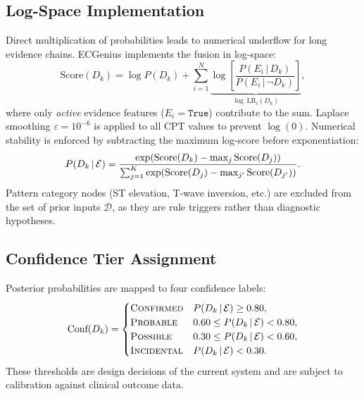 \documentclass[journal]{IEEEtran}
\begin{document}
\subsection{Log-Space Implementation}

Direct multiplication of probabilities leads to numerical underflow
for long evidence chains.
ECGenius implements the fusion in log-space:
\begin{equation}
  \text{Score}(D_k) = \log P(D_k) + \sum_{i=1}^{N}
  \underbrace{\log\!\left[\frac{P(E_i \,|\, D_k)}{P(E_i \,|\, \neg D_k)}\right]}_{\log\,\text{LR}_i(D_k)},
  \label{eq:log_score}
\end{equation}
where only \emph{active} evidence features ($E_i = \texttt{True}$)
contribute to the sum.
Laplace smoothing $\varepsilon = 10^{-6}$ is applied to all CPT
values to prevent $\log(0)$.
Numerical stability is enforced by subtracting the maximum log-score
before exponentiation:
\begin{equation}
  P(D_k \,|\, \mathcal{E}) = \frac{%
  \exp\!\left(\text{Score}(D_k) - \max_{j} \text{Score}(D_j)\right)}{%
  \sum_{j=1}^{K}
  \exp\!\left(\text{Score}(D_j) - \max_{j'} \text{Score}(D_{j'})\right)}.
  \label{eq:softmax_stable}
\end{equation}
Pattern category nodes (ST elevation, T-wave inversion, etc.) are
excluded from the set of prior inputs $\mathcal{D}$, as they are
rule triggers rather than diagnostic hypotheses.

\subsection{Confidence Tier Assignment}
\label{sec:confidence}

Posterior probabilities are mapped to four confidence labels:
\begin{equation}
  \text{Conf}(D_k) =
  \begin{cases}
    \textsc{Confirmed}   & P(D_k \,|\, \mathcal{E}) \geq 0.80, \\
    \textsc{Probable}    & 0.60 \leq P(D_k \,|\, \mathcal{E}) < 0.80, \\
    \textsc{Possible}    & 0.30 \leq P(D_k \,|\, \mathcal{E}) < 0.60, \\
    \textsc{Incidental}  & P(D_k \,|\, \mathcal{E}) < 0.30.
  \end{cases}
  \label{eq:conf}
\end{equation}
These thresholds are design decisions of the current system and
are subject to calibration against clinical outcome data.
\end{document}
